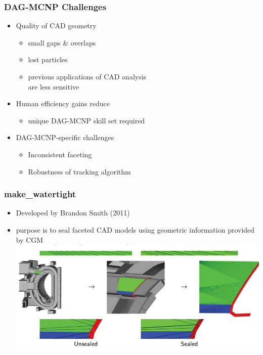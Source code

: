 \documentclass[14pt]{beamer}
\begin{document}
\begin{frame}
\frametitle{DAG-MCNP Challenges}
\begin{itemize}
\vfill

\item Quality of CAD geometry
	\begin{itemize}
	\color{red}
	\item small gaps \& overlaps
	\item lost particles
	\item previous applications of CAD analysis \\
	are less sensitive
	\end{itemize}
\vfill
\item Human efficiency gains reduce
	\begin{itemize}
	\item unique DAG-MCNP skill set required
	\end{itemize}
\vfill
\item DAG-MCNP-specific challenges
	\begin{itemize}
	\item Inconsistent faceting
	\item Robustness of tracking algorithm
	\end{itemize}
\end{itemize}
\end{frame}

\begin{frame}
\frametitle{make\_watertight}
\begin{itemize}
\item Developed by Brandon Smith (2011)
\item purpose is to seal faceted CAD models using geometric information provided by CGM
\vfill
\includegraphics[scale=0.4, trim = 80 0 0 0]{sealing_ex.png}
\end{itemize}
\end{frame}
\end{document}
